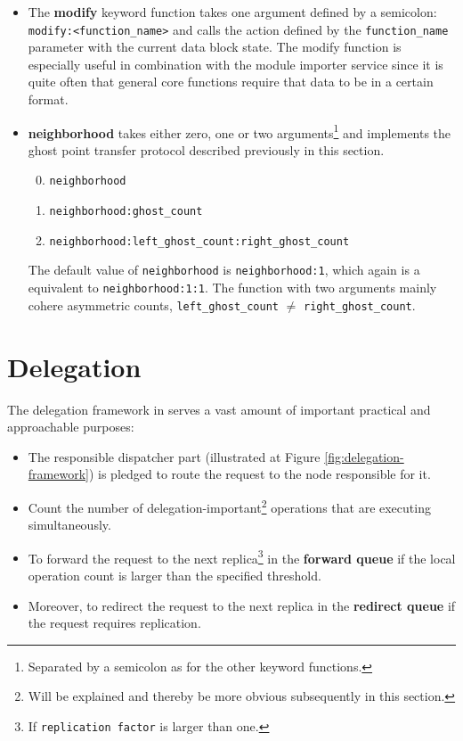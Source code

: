 \begin{itemize}
	\item The \textbf{modify} keyword function takes one argument defined by a semicolon: \texttt{modify:<function\_name>} and calls the action defined by the \texttt{function\_name} parameter with the current data block state. The modify function is especially useful in combination with the module importer service since it is quite often that general core functions require that data to be in a certain format.
	\item \textbf{neighborhood} takes either zero, one or two arguments\footnote{Separated by a semicolon as for the other keyword functions.} and implements the ghost point transfer protocol described previously in this section.
	\begin{enumerate}
		\setcounter{enumi}{-1}
		\item \texttt{neighborhood}
		\item \texttt{neighborhood:ghost\_count}
		\item \texttt{neighborhood:left\_ghost\_count:right\_ghost\_count}
	\end{enumerate}
	The default value of \texttt{neighborhood} is \texttt{neighborhood:1}, which again is a equivalent to \texttt{neighborhood:1:1}. The function with two arguments mainly cohere asymmetric counts, \ie \texttt{left\_ghost\_count} $\neq$ \texttt{right\_ghost\_count}.	
\end{itemize}

\section{Delegation} \label{sec:delegation}
The delegation framework in \CodeName serves a vast amount of important practical and approachable purposes:
\begin{itemize}
	\item The responsible dispatcher part (illustrated at Figure \ref{fig:delegation-framework}) is pledged to route the request to the node responsible for it.
	\item Count the number of delegation-important\footnote{\label{note:explained}Will be explained and thereby be more obvious subsequently in this section.} operations that are executing simultaneously.
	\item To forward the request to the next replica\footnote{\label{note:replication-factor}If \texttt{replication factor} is larger than one.} in the \textbf{forward queue} if the local operation count is larger than the specified threshold.
	\item Moreover, to redirect the request to the next replica in the \textbf{redirect queue} if the request requires replication.
\end{itemize}
\vspace*{4mm}

